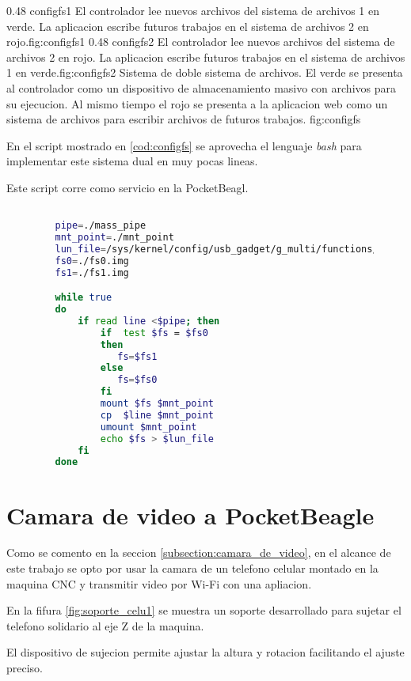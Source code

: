 \subfigab 
{0.48} {configfs1} {El controlador lee nuevos archivos del sistema de archivos 1 en verde. La aplicacion escribe futuros trabajos en el sistema de archivos 2 en rojo.}{fig:configfs1}
{0.48} {configfs2} {El controlador lee nuevos archivos del sistema de archivos 2 en rojo. La aplicacion escribe futuros trabajos en el sistema de archivos 1 en verde.}{fig:configfs2}
   {Sistema de doble sistema de archivos. El verde se presenta al controlador como un dispositivo de almacenamiento masivo con archivos para su ejecucion. Al mismo tiempo el rojo se presenta a la aplicacion web como un sistema de archivos para escribir archivos de futuros trabajos.}
   {fig:configfs}

   En el script mostrado en \ref{cod:configfs} se aprovecha el lenguaje \textit{bash} para implementar este sistema dual en muy pocas lineas.\par
   Este script corre como servicio en la PocketBeagl.

\begin{figure}[h]
   \begin{lstlisting}[language=bash,caption={Implementacion de doble sistema de archivos conectado con la tecnologia configFS. Se aprovecha la potencia del lenguaje de scripting y se corre como servicio.},label={cod:configfs}]

   pipe=./mass_pipe
   mnt_point=./mnt_point
   lun_file=/sys/kernel/config/usb_gadget/g_multi/functions/mass_storage.usb0/lun.0/file
   fs0=./fs0.img
   fs1=./fs1.img

   while true
   do
       if read line <$pipe; then
           if  test $fs = $fs0
           then
              fs=$fs1
           else
              fs=$fs0
           fi
           mount $fs $mnt_point
           cp  $line $mnt_point
           umount $mnt_point
           echo $fs > $lun_file
       fi
   done
   \end{lstlisting}
\end{figure}


\section{Camara de video a PocketBeagle}
Como se comento en la seccion \ref{subsection:camara_de_video}, en el alcance de este trabajo se opto por usar la camara de un telefono celular montado en la maquina CNC y transmitir video por Wi-Fi con una apliacion.\par
   En la fifura \ref{fig:soporte_celu1} se muestra un soporte desarrollado para sujetar el telefono solidario al eje Z de la maquina.\par
   El dispositivo de sujecion permite ajustar la altura y rotacion facilitando el ajuste preciso.\par

